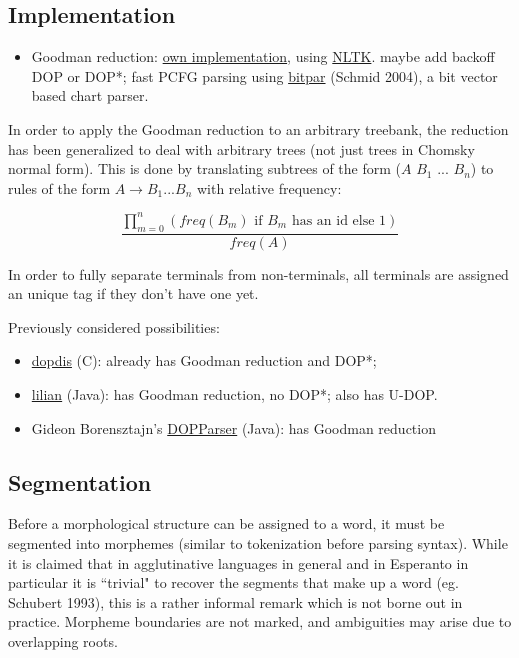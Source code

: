 \documentclass[10pt,a4paper]{article}
\begin{document}
\subsection{Implementation}

\begin{itemize}
\item Goodman reduction: \href{http://www.github.com/andreasvc/eodop}{own implementation}, using 
\href{http://groups.google.com/group/nltk-dev/browse_thread/thread/86ca038723195978/c112b8d171b33d25}{NLTK}. 
maybe add backoff DOP or DOP*; fast PCFG parsing using 
\href{http://www.ims.uni-stuttgart.de/tcl/SOFTWARE/BitPar.html}{bitpar} 
(Schmid 2004), a bit vector based chart parser.
\end{itemize}

In order to apply the Goodman reduction to an arbitrary treebank, the reduction
has been generalized to deal with arbitrary trees (not just trees in Chomsky
normal form). This is done by translating subtrees of the form 
($A$ $B_1$ ... $B_n$) to rules of the form $A \rightarrow B_1 ... B_n$ with
relative frequency:

\[
\frac{\displaystyle\prod_{m = 0}^n(
\text{$freq(B_m)$ if $B_m$ has an id else $1$})}{freq(A)}
\] 

\vspace{2em}
In order to fully separate terminals from non-terminals, all terminals are
assigned an unique tag if they don't have one yet.

Previously considered possibilities:

\begin{itemize}
\item \href{http://staff.science.uva.nl/~simaan/dopdis/}{dopdis} (C): already
has Goodman reduction and DOP*;
\item \href{http://sourceforge.net/projects/lilian/}{lilian} (Java): has
Goodman reduction, no DOP*; also has U-DOP.
\item Gideon Borensztajn's \href{http://staff.science.uva.nl/~gideon/sourcecode/DOPParser.tar.gz}{DOPParser} (Java): has Goodman reduction
\end{itemize}

\subsection{Segmentation}

Before a morphological structure can be assigned to a word, it must be
segmented into morphemes (similar to tokenization before parsing syntax). While
it is claimed that in agglutinative languages in general and in Esperanto in
particular it is ``trivial" to recover the segments that make up a word (eg.
Schubert 1993), this is a rather informal remark which is not borne out in
practice.  Morpheme boundaries are not marked, and ambiguities may arise due to
overlapping roots.
\end{document}
